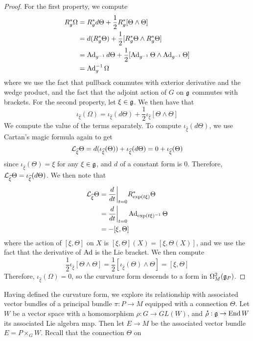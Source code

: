 \begin{proof}
For the first property, we compute
\begin{align*}
R_g^*\Omega &= R_g^*d\Theta + \frac{1}{2} R_g^*[\Theta \wedge \Theta] \\
&= d(R_g^*\Theta)+ \frac{1}{2}[R_g^*\Theta \wedge R_g^*\Theta]\\
&= \operatorname{Ad}_{g^{-1}}d\Theta + \frac{1}{2}[\operatorname{Ad}_{g^{-1}}\Theta \wedge \operatorname{Ad}_{g^{-1}}\Theta] \\
&= \operatorname{Ad}_g^{-1}\Omega
\end{align*}
where we use the fact that pullback commutes with exterior derivative and
the wedge product, and the fact that the adjoint action of $G$ on $\mathfrak{g}$ commutes with
brackets. For the second property, let $\xi \in \mathfrak{g}$. We then have that
\[
\iota_{\widehat{\xi}}(\Omega) = \iota_{\widehat{\xi}}(d\Theta)
+ \frac{1}{2}\iota_{\widehat{\xi}}[\Theta \wedge \Theta]
\]
We compute the value of the terms separately. To compute
$\iota_{\widehat{\xi}}(d\Theta)$, we use Cartan's magic formula again to get
\[
\mathcal{L}_{\widehat{\xi}}\Theta = d(\iota_{\widehat{\xi}}(\Theta))
+ \iota_{\widehat{\xi}}(d\Theta) = 0 + \iota_{\widehat{\xi}}(\Theta)
\]
since $\iota_{\widehat{\xi}}(\Theta) = \xi$ for any $\xi \in \mathfrak{g}$, and $d$ of a
constant form is $0$. Therefore,
$\mathcal{L}_{\widehat{\xi}}\Theta = \iota_{\widehat{\xi}}(d\Theta)$. We then note that
\begin{align*}
\mathcal{L}_{\widehat{\xi}}\Theta &= \frac{d}{dt}\bigg\vert_{t = 0} R_{\exp(t\xi)}^*\Theta \\
&= \frac{d}{dt}\bigg\vert_{t=0} \operatorname{Ad}_{\exp(t\xi)^{-1}}\Theta \\
&= -[\xi, \Theta]
\end{align*}
where the action of $[\xi, \Theta]$ on $X$ is $[\xi, \Theta](X) = [\xi,\Theta(X)]$,
and we use the fact that the derivative of $\operatorname{Ad}$ is the Lie bracket. We then compute
\[
\frac{1}{2}\iota_{\widehat{\xi}}[\Theta \wedge \Theta] =
\frac{1}{2}[\iota_{\widehat{\xi}}(\Theta) \wedge \Theta] = [\xi, \Theta]
\]
Therefore, $\iota_{\widehat{\xi}}(\Omega) = 0$, so the curvature form descends to a
form in $\Omega_M^2(\mathfrak{g}_P)$.
\end{proof}
%
Having defined the curvature form, we explore its relationship with associated
vector bundles of a principal bundle $\pi : P \to M$ equipped with a connection $\Theta$.
Let $W$ be a vector space with a homomorphism $\rho : G \to GL(W)$, and
$\accentset{\mbox{\large\bfseries .}}{\rho} : \mathfrak{g} \to \operatorname{End} W$ its associated Lie algebra map. Then let $E \to M$ be
the associated vector bundle $E = P \times_G W$. Recall that the connection $\Theta$ on
